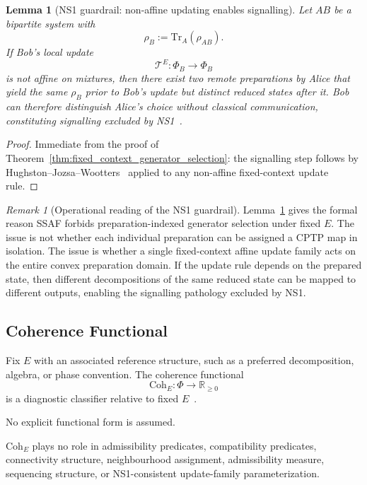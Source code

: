 \documentclass[aps,prx,onecolumn,11pt]{revtex4-2}
\theoremstyle{plain}
\newtheorem{lemma}{Lemma}
\theoremstyle{definition}
\theoremstyle{remark}
\newtheorem{remark}{Remark}
\begin{document}
\begin{lemma}[NS1 guardrail: non-affine updating enables signalling]
\label{lem:NS1_state_dependent_rates_signal}
Let \(AB\) be a bipartite system with
\[
\rho_B := \mathrm{Tr}_A(\rho_{AB}).
\]
If Bob's local update
\[
\mathcal{T}^E:\Phi_B\to\Phi_B
\]
is not affine on mixtures, then there exist two remote preparations by
Alice that yield the same \(\rho_B\) prior to Bob's update but distinct
reduced states after it. Bob can therefore distinguish Alice's choice
without classical communication, constituting signalling excluded by
NS1~\cite{Gisin1989,Gisin1990}.
\end{lemma}

\begin{proof}
Immediate from the proof of
Theorem~\ref{thm:fixed_context_generator_selection}: the signalling
step follows by
Hughston--Jozsa--Wootters~\cite{HughstonJozsaWootters1993} applied to
any non-affine fixed-context update rule.
\end{proof}

\begin{remark}[Operational reading of the NS1 guardrail]
Lemma~\ref{lem:NS1_state_dependent_rates_signal} gives the formal reason SSAF forbids
preparation-indexed generator selection under fixed \(E\). The issue is
not whether each individual preparation can be assigned a CPTP map in
isolation. The issue is whether a single fixed-context affine update
family acts on the entire convex preparation domain. If the update rule
depends on the prepared state, then different decompositions of the
same reduced state can be mapped to different outputs, enabling the
signalling pathology excluded by NS1.
\end{remark}

\subsection{Coherence Functional}
\label{subsec:coherence_functional}

Fix \(E\) with an associated reference structure, such as a preferred
decomposition, algebra, or phase convention. The coherence functional
\[
\mathrm{Coh}_E : \Phi \longrightarrow \mathbb{R}_{\ge 0}
\]
is a diagnostic classifier relative to fixed
\(E\)~\cite{Baumgratz2014,ChitambarGour2019,Schlosshauer2007}.

No explicit functional form is assumed.

\(\mathrm{Coh}_E\) plays no role in admissibility predicates,
compatibility predicates, connectivity structure, neighbourhood
assignment, admissibility measure, sequencing structure, or
NS1-consistent update-family parameterization.
\end{document}
